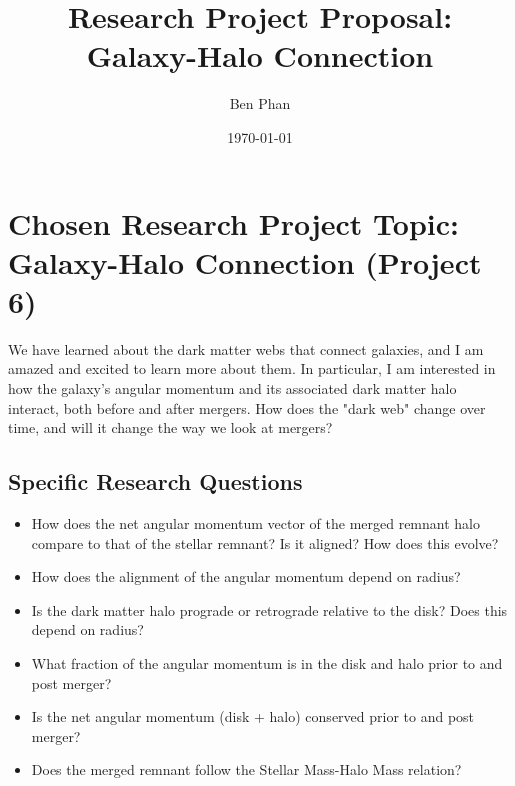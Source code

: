 \documentclass[12pt]{article}
\title{Research Project Proposal: Galaxy-Halo Connection}
\author{Ben Phan}
\date{\today}
\begin{document}
\maketitle

\section*{Chosen Research Project Topic: Galaxy-Halo Connection (Project 6)}

We have learned about the dark matter webs that connect galaxies, and I am amazed and excited to learn more about them. In particular, I am interested in how the galaxy's angular momentum and its associated dark matter halo interact, both before and after mergers. How does the "dark web" change over time, and will it change the way we look at mergers?

\subsection*{Specific Research Questions}

\begin{itemize}
    \item How does the net angular momentum vector of the merged remnant halo compare to that of the stellar remnant? Is it aligned? How does this evolve?
    \item How does the alignment of the angular momentum depend on radius?
    \item Is the dark matter halo prograde or retrograde relative to the disk? Does this depend on radius?
    \item What fraction of the angular momentum is in the disk and halo prior to and post merger?
    \item Is the net angular momentum (disk + halo) conserved prior to and post merger?
    \item Does the merged remnant follow the Stellar Mass-Halo Mass relation?
\end{itemize}
\end{document}
